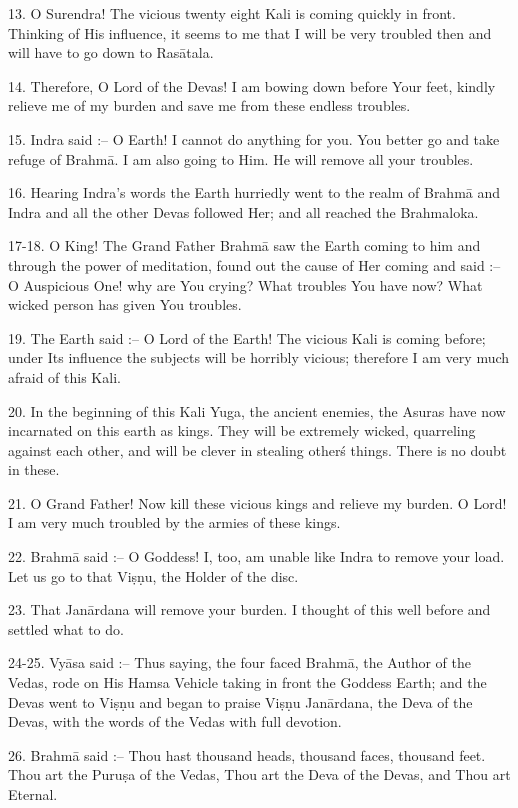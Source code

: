 13. O Surendra! The vicious twenty eight Kali is coming quickly in front. Thinking of His influence, it seems to me that I will be very troubled then and will have to go down to Ras\=atala.

14. Therefore, O Lord of the Devas! I am bowing down before Your feet, kindly relieve me of my burden and save me from these endless troubles.

15. Indra said :-- O Earth! I cannot do anything for you. You better go and take refuge of Brahm\=a. I am also going to Him. He will remove all your troubles.

16. Hearing Indra's words the Earth hurriedly went to the realm of Brahm\=a and Indra and all the other Devas followed Her; and all reached the Brahmaloka.

17-18. O King! The Grand Father Brahm\=a saw the Earth coming to him and through the power of meditation, found out the cause of Her coming and said :-- O Auspicious One! why are You crying? What troubles You have now? What wicked person has given You troubles.

19. The Earth said :-- O Lord of the Earth! The vicious Kali is coming before; under Its influence the subjects will be horribly vicious; therefore I am very much afraid of this Kali.

20. In the beginning of this Kali Yuga, the ancient enemies, the Asuras have now incarnated on this earth as kings. They will be extremely wicked, quarreling against each other, and will be clever in stealing other\'s things. There is no doubt in these.

21. O Grand Father! Now kill these vicious kings and relieve my burden. O Lord! I am very much troubled by the armies of these kings.

22. Brahm\=a said :-- O Goddess! I, too, am unable like Indra to remove your load. Let us go to that Vi\d{s}\d{n}u, the Holder of the disc.

23. That Jan\=ardana will remove your burden. I thought of this well before and settled what to do.

24-25. Vy\=asa said :-- Thus saying, the four faced Brahm\=a, the Author of the Vedas, rode on His Hamsa Vehicle taking in front the Goddess Earth; and the Devas went to Vi\d{s}\d{n}u and began to praise Vi\d{s}\d{n}u Jan\=ardana, the Deva of the Devas, with the words of the Vedas with full devotion.

26. Brahm\=a said :-- Thou hast thousand heads, thousand faces, thousand feet. Thou art the Puru\d{s}a of the Vedas, Thou art the Deva of the Devas, and Thou art Eternal.

